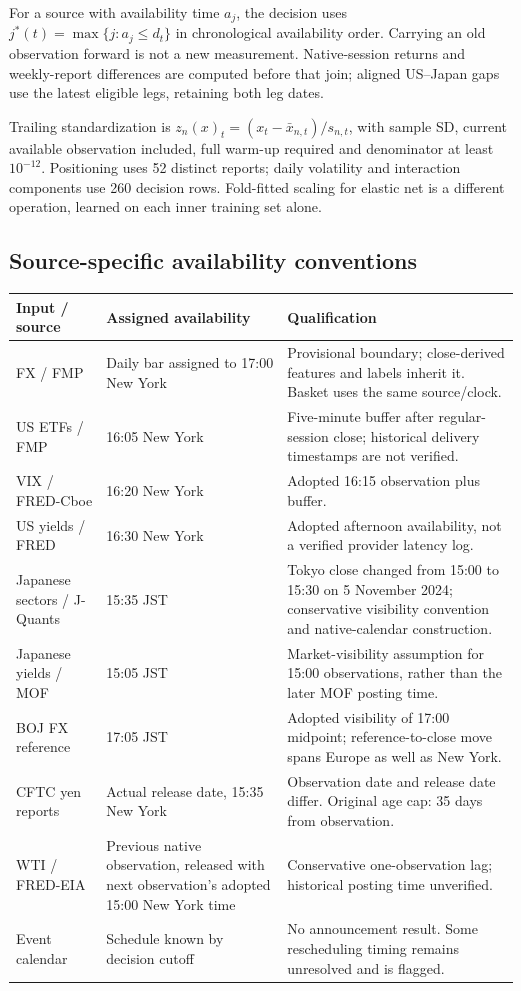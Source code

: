 \documentclass[11pt,a4paper]{article}
\begin{document}
For a source with availability time $a_j$, the decision uses $j^*(t)=\max\{j:a_j\le d_t\}$ in chronological availability order. Carrying an old observation forward is not a new measurement. Native-session returns and weekly-report differences are computed before that join; aligned US--Japan gaps use the latest eligible legs, retaining both leg dates.

Trailing standardization is $z_n(x)_t=(x_t-\bar x_{n,t})/s_{n,t}$, with sample SD, current available observation included, full warm-up required and denominator at least $10^{-12}$. Positioning uses 52 distinct reports; daily volatility and interaction components use 260 decision rows. Fold-fitted scaling for elastic net is a different operation, learned on each inner training set alone.

\subsection*{Source-specific availability conventions}
\begingroup\small
\begin{longtable}{@{}p{.22\linewidth}p{.29\linewidth}p{.43\linewidth}@{}}\toprule
Input / source & Assigned availability & Qualification\\\midrule\endhead
FX / FMP & Daily bar assigned to 17:00 New York & Provisional boundary; close-derived features and labels inherit it. Basket uses the same source/clock.\\
US ETFs / FMP & 16:05 New York & Five-minute buffer after regular-session close; historical delivery timestamps are not verified.\\
VIX / FRED-Cboe & 16:20 New York & Adopted 16:15 observation plus buffer.\\
US yields / FRED & 16:30 New York & Adopted afternoon availability, not a verified provider latency log.\\
Japanese sectors / J-Quants & 15:35 JST & Tokyo close changed from 15:00 to 15:30 on 5 November 2024; conservative visibility convention and native-calendar construction.\\
Japanese yields / MOF & 15:05 JST & Market-visibility assumption for 15:00 observations, rather than the later MOF posting time.\\
BOJ FX reference & 17:05 JST & Adopted visibility of 17:00 midpoint; reference-to-close move spans Europe as well as New York.\\
CFTC yen reports & Actual release date, 15:35 New York & Observation date and release date differ. Original age cap: 35 days from observation.\\
WTI / FRED-EIA & Previous native observation, released with next observation's adopted 15:00 New York time & Conservative one-observation lag; historical posting time unverified.\\
Event calendar & Schedule known by decision cutoff & No announcement result. Some rescheduling timing remains unresolved and is flagged.\\\bottomrule
\end{longtable}\endgroup
\end{document}
